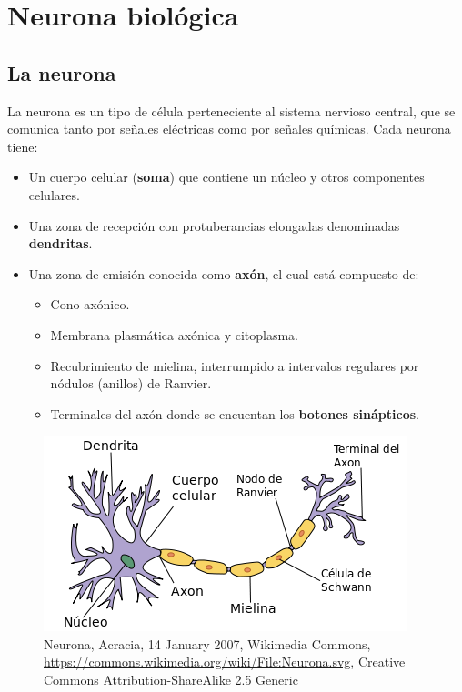 \section{Neurona biológica}
\subsection{La neurona}
La neurona es un tipo de célula perteneciente al sistema nervioso central, que se comunica tanto por señales eléctricas como por señales químicas. Cada neurona tiene:


 \begin{itemize}
	\item Un cuerpo celular (\textbf{soma}) que contiene un núcleo y otros componentes celulares.
	\item Una zona de recepción con protuberancias elongadas denominadas \textbf{dendritas}.
	\item Una zona de emisión conocida como \textbf{axón}, el cual está compuesto de:
		\begin {itemize}
			\item Cono axónico.
			\item Membrana plasmática axónica y citoplasma.
			\item Recubrimiento de mielina, interrumpido a intervalos regulares por nódulos (anillos) de Ranvier.
			\item Terminales del axón donde se encuentan los \textbf{botones sinápticos}. 
		\end{itemize}
 \end{itemize}


\begin{figure}[h]
 \centering
 \includegraphics[scale=0.6]{../Figuras/neuronaPartes.png}
 \caption{Neurona, Acracia, 14 January 2007, Wikimedia Commons, \url{https://commons.wikimedia.org/wiki/File:Neurona.svg}, Creative Commons Attribution-ShareAlike 2.5 Generic}
 \label{fig:neuronaP}
\end{figure}


